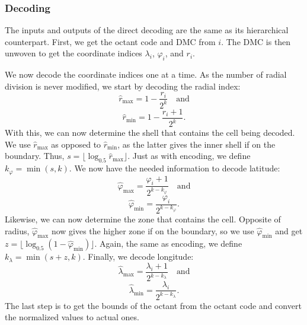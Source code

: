 \subsubsection{Decoding}
The inputs and outputs of the direct decoding are the same as its hierarchical counterpart.
First, we get the octant code and DMC from $i$.
The DMC is then unwoven to get the coordinate indices $\lambda_i$, $\varphi_i$, and $r_i$.


We now decode the coordinate indices one at a time.
As the number of radial division is never modified, we start by decoding the radial index: 
%
\begin{equation*}
\hat{r}_\mathrm{max} = 1 - \frac{r_i}{2^k} \quad \text{and}
\end{equation*}
%
\begin{equation*}
\hat{r}_\mathrm{min} = 1 - \frac{r_i + 1}{2^k}.
\end{equation*}
%
With this, we can now determine the shell that contains the cell being decoded.
We use $\hat{r}_\mathrm{max}$ as opposed to $\hat{r}_\mathrm{min}$, as the latter gives the inner shell if on the boundary. Thus, $s = \lfloor \log_{0.5} \hat{r}_\mathrm{max} \rfloor$.
Just as with encoding, we define $k_\varphi = \min ( s, k )$.
We now have the needed information to decode latitude:
%
\begin{equation*}
\hat{\varphi}_\mathrm{max} = \frac{\varphi_i + 1}{2^{k - k_\varphi}} \quad \text{and}
\end{equation*}
%
\begin{equation*}
\hat{\varphi}_\mathrm{min} = \frac{\varphi_i}{2^{k - k_\varphi}}.
\end{equation*}
%
Likewise, we can now determine the zone that contains the cell.
Opposite of radius, $\hat{\varphi}_\mathrm{max}$ now gives the higher zone if on the boundary, so we use $\hat{\varphi}_\mathrm{min}$ and get $z = \lfloor \log_{0.5} ( 1 - \hat{\varphi}_\mathrm{min} ) \rfloor$.
Again, the same as encoding, we define $k_\lambda = \min ( s + z, k )$.
Finally, we decode longitude:
%
\begin{equation*}
\hat{\lambda}_\mathrm{max} = \frac{\lambda_i + 1}{2^{k - k_\lambda}} \quad \text{and}
\end{equation*}
%
\begin{equation*}
\hat{\lambda}_\mathrm{min} = \frac{\lambda_i}{2^{k - k_\lambda}}.
\end{equation*}
%
The last step is to get the bounds of the octant from the octant code and convert the normalized values to actual ones.


